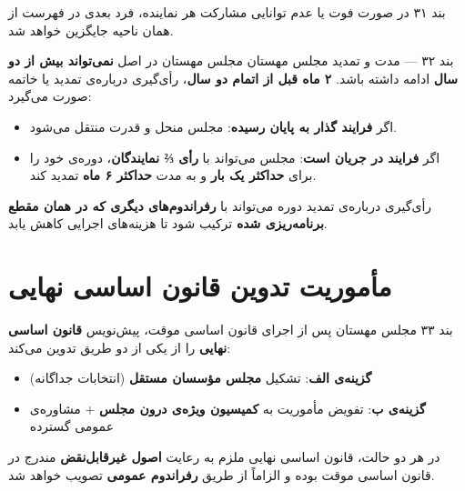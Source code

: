\documentclass[12pt,a4paper,twoside,openany]{book}
\begin{document}
	\begin{bandbox}{بند ۳۱}
		در صورت فوت یا عدم توانایی مشارکت هر نماینده، فرد بعدی در فهرست از همان ناحیه
		جایگزین خواهد شد.
	\end{bandbox}
	
	\begin{bandbox}{بند ۳۲ --- مدت و تمدید مجلس مهستان}
		مجلس مهستان در اصل \textbf{نمی‌تواند بیش از دو سال} ادامه داشته باشد.
		\textbf{۲ ماه قبل از اتمام دو سال}، رأی‌گیری درباره‌ی تمدید یا خاتمه صورت می‌گیرد:
		
		\begin{itemize}
			\item اگر \textbf{فرایند گذار به پایان رسیده}: مجلس منحل و قدرت منتقل می‌شود.
			\item اگر \textbf{فرایند در جریان است}: مجلس می‌تواند با \textbf{رأی ⅔ نمایندگان}،
			دوره‌ی خود را برای \textbf{حداکثر یک بار} و به مدت \textbf{حداکثر ۶ ماه} تمدید کند.
		\end{itemize}
		
		\begin{infobox}
			رأی‌گیری درباره‌ی تمدید دوره می‌تواند با \textbf{رفراندوم‌های دیگری که در همان
				مقطع برنامه‌ریزی شده} ترکیب شود تا هزینه‌های اجرایی کاهش یابد.
		\end{infobox}
	\end{bandbox}
	
	\section{مأموریت تدوین قانون اساسی نهایی}
	
	\begin{bandbox}{بند ۳۳}
		مجلس مهستان پس از اجرای قانون اساسی موقت، پیش‌نویس \textbf{قانون اساسی نهایی}
		را از یکی از دو طریق تدوین می‌کند:
		\begin{itemize}
			\item \textbf{گزینه‌ی الف}: تشکیل \textbf{مجلس مؤسسان مستقل} (انتخابات جداگانه)
			\item \textbf{گزینه‌ی ب}: تفویض مأموریت به \textbf{کمیسیون ویژه‌ی درون مجلس}
			+ مشاوره‌ی عمومی گسترده
		\end{itemize}
		در هر دو حالت، قانون اساسی نهایی ملزم به رعایت \textbf{اصول غیرقابل‌نقض} مندرج
		در قانون اساسی موقت بوده و الزاماً از طریق \textbf{رفراندوم عمومی} تصویب خواهد شد.
	\end{bandbox}
	
\end{document}
